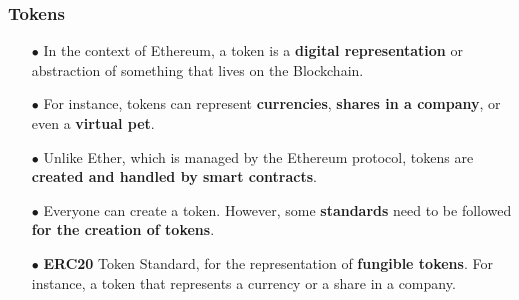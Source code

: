 \documentclass{beamer}
\begin{document}
\begin{frame}
	\frametitle{Tokens}
	\begin{itemize}
		\item[$\bullet$]  In the context of Ethereum, a token is a \textbf{digital representation} or abstraction of something that lives on the Blockchain.
		\item[$\bullet$] For instance, tokens can represent \textbf{currencies}, \textbf{shares in a company}, or even a \textbf{virtual pet}. 
		\item[$\bullet$] Unlike Ether, which is managed by the Ethereum protocol, tokens are \textbf{created and handled by smart contracts}. 
		\item[$\bullet$] Everyone can create a token. However, some \textbf{standards} need to be followed \textbf{for the creation of tokens}. 
		\item[$\bullet$] \textbf{ERC20} Token Standard, for the representation of \textbf{fungible tokens}. For instance, a token that represents a currency or a share in a company. 
	\end{itemize}
\end{frame}
\end{document}
